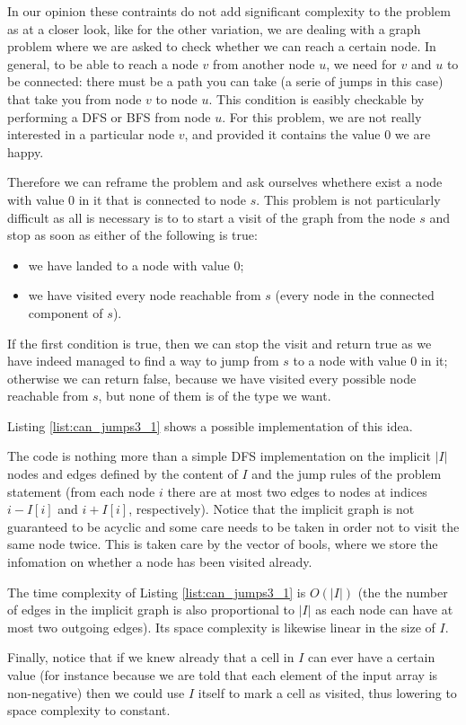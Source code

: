In our opinion these contraints do not add significant complexity to the problem as at a closer look, like for the other variation, we are dealing with a graph problem where we are asked to check whether we can reach a certain node.
In general, to be able to reach a node $v$ from another node $u$, we need for $v$ and $u$ to be connected: there must be a path you can take (a serie of jumps in this case) that take you from node $v$ to node $u$.
This condition is easibly checkable by performing a DFS or BFS from node $u$.
For this problem, we are not really interested in a particular node $v$, and provided it contains the value $0$ we are happy.

Therefore we can reframe the problem and ask ourselves whethere exist a node with value $0$ in it that is connected to node $s$. 
This problem is not particularly difficult as all is necessary is to to start a visit of the graph from the node $s$ and stop as soon as either of the following is true:
\begin{itemize}
    \item we have landed to a node with value $0$;
    \item we have visited every node reachable from $s$ (every node in the connected component of $s$).
\end{itemize}
If the first condition is true, then we can stop the visit and return true as we have indeed managed to find a way to jump from $s$ to a node with value $0$ in it; otherwise we can return false, because we have visited every possible node reachable from $s$, but none of them is of the type we want.

Listing \ref{list:can_jumps3_1} shows a possible implementation of this idea.



The code is nothing more than a simple DFS implementation on the implicit $|I|$ nodes and edges defined by the content of $I$ and the jump rules of the problem statement (from each node $i$ there are at most two edges to nodes at indices $i-I[i]$ and $i+I[i]$, respectively).
Notice that the implicit graph is not guaranteed to be acyclic and some care needs to be taken in order not to visit the same node twice. This is taken care by the  vector of bools, where we store the infomation on whether a node has been visited already.

The time complexity of Listing \ref{list:can_jumps3_1} is $O(|I|)$ (the the number of edges in the implicit graph is also proportional to $|I|$ as each node can have at most two outgoing edges). Its space complexity is likewise linear in the size of $I$.

Finally, notice that if we knew already that a cell in $I$ can ever have a certain value (for instance because we are told that each element of the input array is non-negative) then we could use $I$ itself to mark a cell as visited, thus lowering to space complexity to constant.
